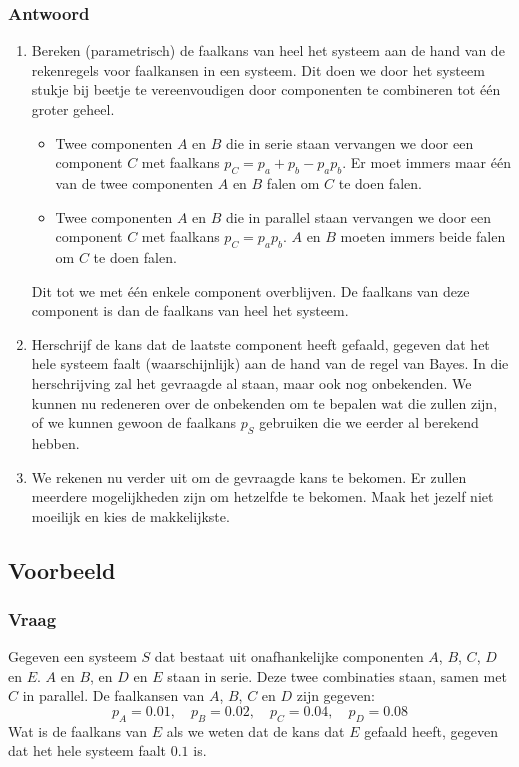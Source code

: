 \documentclass[main.tex]{subfiles}
\begin{document}
\subsubsection*{Antwoord}
\begin{enumerate}
\item Bereken (parametrisch) de faalkans van heel het systeem aan de hand van de rekenregels voor faalkansen in een systeem.
  Dit doen we door het systeem stukje bij beetje te vereenvoudigen door componenten te combineren tot \'e\'en groter geheel.
  \begin{itemize}
  \item Twee componenten $A$ en $B$ die in serie staan vervangen we door een component $C$ met faalkans $p_{C} = p_{a} + p_{b} - p_{a}p_{b}$. Er moet immers maar \'e\'en van de twee componenten $A$ en $B$ falen om $C$ te doen falen.
  \item Twee componenten $A$ en $B$ die in parallel staan vervangen we door een component $C$ met faalkans $p_{C} = p_{a}p_{b}$. $A$ en $B$ moeten immers beide falen om $C$ te doen falen.
  \end{itemize}
  Dit tot we met \'e\'en enkele component overblijven.
  De faalkans van deze component is dan de faalkans van heel het systeem.
\item Herschrijf de kans dat de laatste component heeft gefaald, gegeven dat het hele systeem faalt (waarschijnlijk) aan de hand van de regel van Bayes.
  In die herschrijving zal het gevraagde al staan, maar ook nog onbekenden.
We kunnen nu redeneren over de onbekenden om te bepalen wat die zullen zijn, of we kunnen gewoon de faalkans $p_{S}$ gebruiken die we eerder al berekend hebben.
\item We rekenen nu verder uit om de gevraagde kans te bekomen. Er zullen meerdere mogelijkheden zijn om hetzelfde te bekomen.
Maak het jezelf niet moeilijk en kies de makkelijkste.
\end{enumerate}

\subsection*{Voorbeeld}
\subsubsection*{Vraag}
Gegeven een systeem $S$ dat bestaat uit onafhankelijke componenten $A$, $B$, $C$, $D$ en $E$.
$A$ en $B$, en $D$ en $E$ staan in serie. Deze twee combinaties staan, samen met $C$ in parallel.
De faalkansen van $A$, $B$, $C$ en $D$ zijn gegeven:
\[ p_{A} = 0.01,\quad p_{B} = 0.02,\quad p_{C} = 0.04,\quad p_{D} = 0.08 \]
Wat is de faalkans van $E$ als we weten dat de kans dat $E$ gefaald heeft, gegeven dat het hele systeem faalt $0.1$ is.
\end{document}
